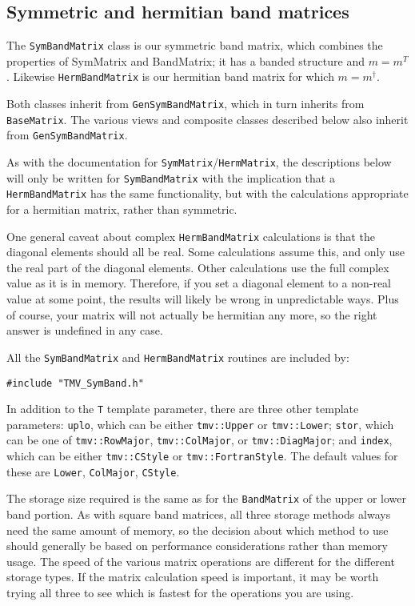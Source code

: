 \documentclass[twoside,letterpaper,11pt]{article}
\renewcommand{\tt}[1]{{\texttt {#1}}}
\begin{document}
\subsection{Symmetric and hermitian band matrices}

The \tt{SymBandMatrix} class is our symmetric band matrix, which combines
the properties of SymMatrix and BandMatrix; it has a banded structure and
$m = m^T$.  Likewise \tt{HermBandMatrix} is our hermitian band matrix for
which $m = m^\dagger$.

Both classes inherit from \tt{GenSymBandMatrix}, which in turn inherits from 
\tt{BaseMatrix}.  The various views and composite classes described below 
also inherit from \tt{GenSymBandMatrix}.

As with the documentation for \tt{SymMatrix}/\tt{HermMatrix}, the descriptions
below will only be written for \tt{SymBandMatrix} with the implication
that a \tt{HermBandMatrix} has the same functionality, but with the calculations
appropriate for a hermitian matrix, rather than symmetric.

One general caveat about complex \tt{HermBandMatrix} calculations is that 
the diagonal elements should all be real.  Some calculations assume this, and 
only use the real part of the diagonal elements.  Other calculations use the 
full complex value as it is in memory.  Therefore, if you set a diagonal element
to a non-real value at some point, the results will likely be wrong in 
unpredictable ways.  Plus of course, your matrix will not actually be 
hermitian any more, so the right answer is undefined in any case.

All the \tt{SymBandMatrix} and \tt{HermBandMatrix} routines are included by:
\begin{verbatim}
#include "TMV_SymBand.h"
\end{verbatim}

In addition to the \tt{T} template parameter, there are three other template 
parameters: \tt{uplo}, which can be either \tt{tmv::Upper} or \tt{tmv::Lower};
\tt{stor}, which can be one of \tt{tmv::RowMajor}, \tt{tmv::ColMajor}, or 
\tt{tmv::DiagMajor}; and \tt{index}, which can be either \tt{tmv::CStyle}
or \tt{tmv::FortranStyle}.  The default values for these are 
\tt{Lower}, \tt{ColMajor}, \tt{CStyle}.

The storage size required is the same as for the \tt{BandMatrix} of
the upper or lower band portion.
As with square band matrices, 
all three storage methods always need the same amount of memory, so the 
decision about which method to use should generally be based on performance 
considerations rather than memory usage.
The speed of the various matrix operations are different for the different storage 
types.  If the matrix calculation speed is important, it may be worth trying 
all three to see which is fastest for the operations you are using.
\end{document}

